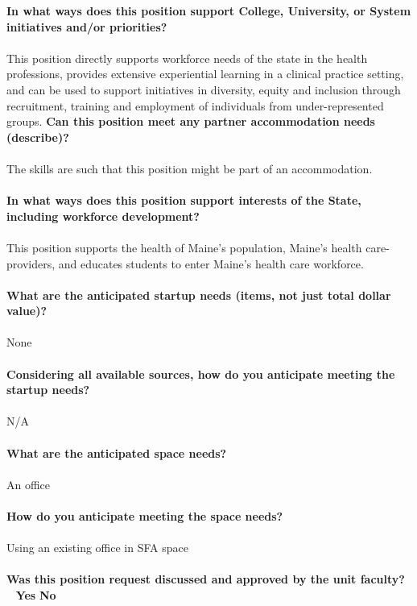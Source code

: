 \documentclass[11pt]{article}
\begin{document}
\newpage
\noindent\textbf{\rmfamily In what ways does this position support College, University, or System initiatives and/or priorities?}
\\~\\
This position directly supports workforce needs of the state in the health professions, provides extensive experiential learning in a clinical practice setting, and can be used to support initiatives in diversity, equity and inclusion through recruitment, training and employment of individuals from under-represented groups.\vfill
\noindent\textbf{\rmfamily Can this position meet any partner accommodation needs (describe)?}\\~\\
The skills are such that this position might be part of an accommodation.\\~\\
\vfill
\noindent\textbf{\rmfamily In what ways does this position support interests of the State, including workforce development?}\\~\\
This position supports the health of Maine's population, Maine's health care-providers, and educates students to enter Maine's health care workforce.\\~\\
\vfill
\newpage\noindent\textbf{\rmfamily What are the anticipated startup needs (items, not just total dollar value)?}\\~\\
None\\~\\
\vfill
\noindent\textbf{\rmfamily Considering all available sources, how do you anticipate meeting the startup needs?}\\~\\
N/A\\~\\
\vfill
\noindent\textbf{\rmfamily What are the anticipated space needs?}\\~\\
An office\\~\\
\vfill
\noindent\textbf{\rmfamily How do you anticipate meeting the space needs?} \\~\\
Using an existing office in SFA space\\~\\
\vfill
\noindent\textbf{\rmfamily Was this position request discussed and approved by the unit faculty?} \hfill ~ \hfill \textbf{\Large{\CrossedBox} \normalsize{Yes}} \hfill \textbf{\Large{\HollowBox} \normalsize{ No}}\\~\\%
\end{document}
